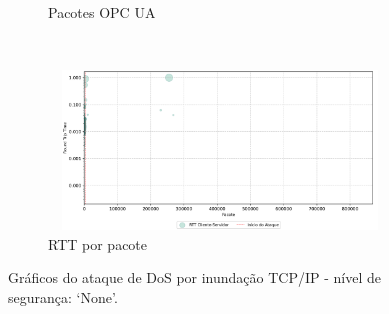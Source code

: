\begin{apendicesenv}
\begin{figure}[htbp!]
\begin{subfigure}[t]{0.5\textwidth}
        \caption{Pacotes OPC UA}
    \end{subfigure}%
    ~
    \begin{subfigure}[t]{0.5\textwidth}
        \centering
        \includegraphics[width=1\textwidth, height=120pt]{USPSC-img/output/cropped/0-dos_hping3-rttp.png}
        \caption{RTT por pacote}
    \end{subfigure}%
    \label{fig:0-dos_hping3}
    \caption{Gráficos do ataque de DoS por inundação TCP/IP - nível de segurança: `None'.}
\end{figure}


\end{apendicesenv}
